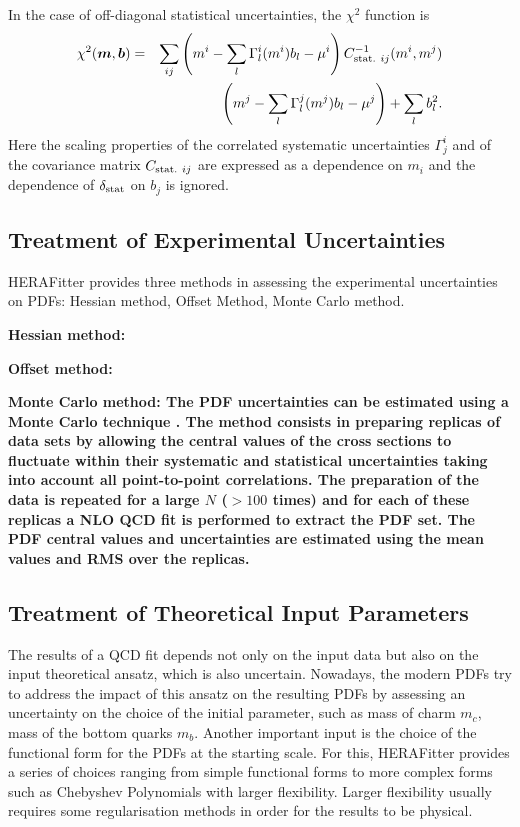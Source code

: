 \begin{description}
In the case of off-diagonal statistical uncertainties, the $\chi^2$ function
is
\begin{eqnarray} 
 \label{eq:chi2gen}
    \chi^2(\boldsymbol{m},\boldsymbol{b})& = & \sum_{ij} 
         \left ( m^i - \sum_l \Gamma^i_l(m^i)b_l - \mu^i \right)  C^{-1}_{{\rm stat.}~ij}(m^i,m^j) \nonumber \\  
    && \left(  m^j - \sum_l \Gamma^j_l(m^j)b_l - \mu^j \right) +  \sum_l b^2_l.
\end{eqnarray}
Here the scaling properties of the correlated systematic uncertainties 
$\Gamma^i_j$ and
of the covariance matrix $C_{{\rm stat.}~ij}$ are expressed as a dependence
on $m_i$ and the dependence of $\delta_{\rm stat}$ on $b_j$ is ignored.
\end{description}


\subsection{Treatment of Experimental Uncertainties}

HERAFitter provides three methods in assessing the experimental uncertainties on PDFs: Hessian method, Offset Method, Monte Carlo method.
\begin{description}
\item \bf{Hessian method:}\rm
\item \bf{Offset  method:} \rm
\item \bf{Monte Carlo method:} \rm
The PDF uncertainties can be estimated using a Monte Carlo technique \cite{Giele:1998gw, mcmethod2}.
The method consists in preparing replicas of data sets by allowing the central values of the cross sections to 
fluctuate within their systematic and statistical uncertainties taking into account all point-to-point correlations.
The preparation of the data is repeated for a large $N$ ($>100$ times) and for each of these replicas a NLO QCD fit is performed to 
extract the PDF set. The PDF central values and uncertainties are estimated using the mean values and RMS 
over the replicas. 
\end{description}


\subsection{Treatment of Theoretical Input Parameters}

The results of a QCD fit depends not only on the input data but also on the 
input theoretical ansatz, which is also uncertain. Nowadays, the modern PDFs 
try to address the impact of this ansatz on the resulting PDFs by assessing an 
uncertainty on the choice of the initial parameter, such as mass of charm $m_c$, mass of the bottom quarks $m_b$. Another important input is the choice of the functional form for the PDFs at the starting scale. 
For this, HERAFitter provides a series of choices ranging from simple functional forms to more complex forms such as Chebyshev Polynomials with larger flexibility. Larger flexibility usually requires some regularisation methods in order for the results to be physical.




